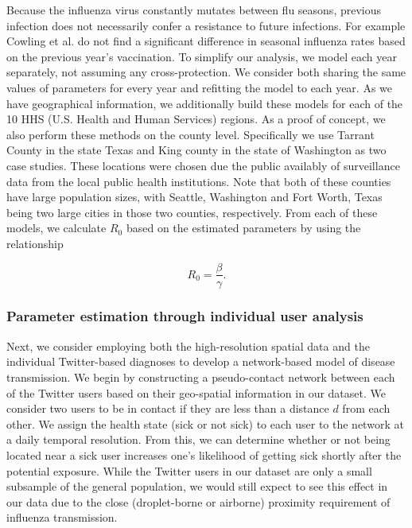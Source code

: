 Because the influenza virus constantly mutates between flu seasons, previous infection does not necessarily confer a resistance to future infections. For example Cowling et al. \cite{cowling2010protective} do not find a significant difference in seasonal influenza rates based on the previous year's vaccination. To simplify our analysis, we model each year separately, not assuming any cross-protection. We consider both sharing the same values of parameters for every year and refitting the model to each year. As we have geographical information, we additionally build these models for each of the 10 HHS (U.S. Health and Human Services) regions. As a proof of concept, we also perform these methods on the county level. Specifically we use Tarrant County in the state Texas and King county in the state of Washington as two case studies. These locations were chosen due the public availably of surveillance data from the local public health institutions. Note that both of these counties have large population sizes, with Seattle, Washington and Fort Worth, Texas being two large cities in those two counties, respectively. From each of these models, we calculate \(R_0\) based on the estimated parameters by using the relationship

\begin{equation}
\label{eq:r0}
R_0 = \frac{\beta}{\gamma}.
\end{equation}

\subsubsection{Parameter estimation through individual user analysis}
\label{methods:individual}
Next, we consider employing both the high-resolution spatial data and the individual Twitter-based diagnoses to develop a network-based model of disease transmission. We begin by constructing a pseudo-contact network between each of the Twitter users based on their geo-spatial information in our dataset. We consider two users to be in contact if they are less than a distance \(d\) from each other. We assign the health state (sick or not sick) to each user to the network at a daily temporal resolution. From this, we can determine whether or not being located near a sick user increases one's likelihood of getting sick shortly after the potential exposure. While the Twitter users in our dataset are only a small subsample of the general population, we would still expect to see this effect in our data due to the close (droplet-borne or airborne) proximity requirement of influenza transmission. \cite{weinstein2003transmission,liem2005lack,cowling2009facemasks}

